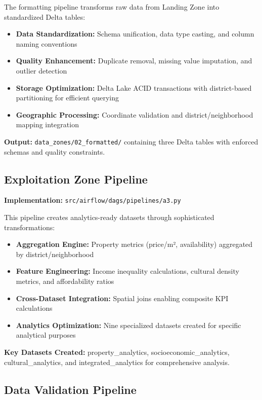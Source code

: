 The formatting pipeline transforms raw data from Landing Zone into standardized Delta tables:

\begin{itemize}[nosep]
\item \textbf{Data Standardization:} Schema unification, data type casting, and column naming conventions
\item \textbf{Quality Enhancement:} Duplicate removal, missing value imputation, and outlier detection
\item \textbf{Storage Optimization:} Delta Lake ACID transactions with district-based partitioning for efficient querying
\item \textbf{Geographic Processing:} Coordinate validation and district/neighborhood mapping integration
\end{itemize}

\textbf{Output:} \texttt{data\_zones/02\_formatted/} containing three Delta tables with enforced schemas and quality constraints.

\subsection{Exploitation Zone Pipeline}

\textbf{Implementation:} \texttt{src/airflow/dags/pipelines/a3.py}

This pipeline creates analytics-ready datasets through sophisticated transformations:

\begin{itemize}[nosep]
\item \textbf{Aggregation Engine:} Property metrics (price/m², availability) aggregated by district/neighborhood
\item \textbf{Feature Engineering:} Income inequality calculations, cultural density metrics, and affordability ratios
\item \textbf{Cross-Dataset Integration:} Spatial joins enabling composite KPI calculations
\item \textbf{Analytics Optimization:} Nine specialized datasets created for specific analytical purposes
\end{itemize}

\textbf{Key Datasets Created:} property\_analytics, socioeconomic\_analytics, cultural\_analytics, and integrated\_analytics for comprehensive analysis.

\subsection{Data Validation Pipeline}

